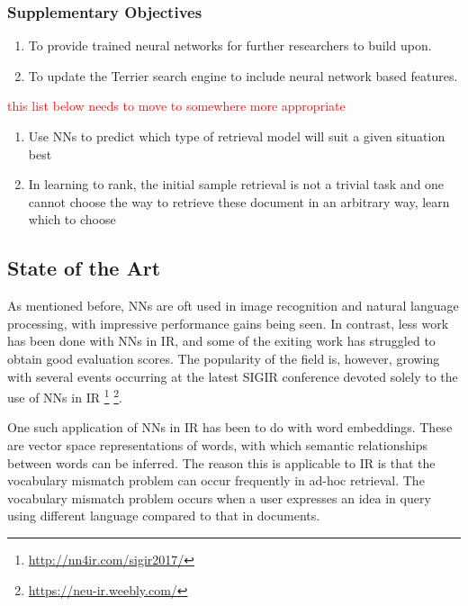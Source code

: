 \documentclass[11pt,english,twocolumn]{article}
\newcommand{\remove}[1]{\textcolor{red}{#1}}
\begin{document}
\subsubsection*{Supplementary Objectives}
\vspace{0.5em}
\begin{enumerate}[label=\textbf{Sup. Obj.\arabic*}, wide=\parindent]
\item To provide trained neural networks for further researchers to build upon.
\item To update the Terrier search engine to include neural network based features.
\end{enumerate}

\remove{this list below needs to move to somewhere more appropriate}

\begin{enumerate}
\item Use NNs to predict which type of retrieval model will suit a given situation best 
\item In learning to rank, the initial sample retrieval is not a trivial task and one cannot choose the way to retrieve these document in an arbitrary way, learn which to choose
\end{enumerate}

\subsection{State of the Art}
As mentioned before, NNs are oft used in image recognition and natural language processing, with impressive performance gains being seen.
In contrast, less work has been done with NNs in IR, and some of the exiting work has struggled to obtain good evaluation scores.
The popularity of the field is, however, growing with several events occurring at the latest SIGIR conference devoted solely to the use of NNs in IR \footnote{\url{http://nn4ir.com/sigir2017/}} \footnote{\url{https://neu-ir.weebly.com/}}.

One such application of NNs in IR has been to do with word embeddings. These are vector space representations of words, with which semantic relationships between words can be inferred. 
The reason this is applicable to IR is that the vocabulary mismatch problem can occur frequently in ad-hoc retrieval. 
The vocabulary mismatch problem occurs when a user expresses an idea in query using different language compared to that in documents.
\end{document}
